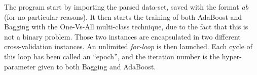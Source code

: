 The program start by importing the parsed data-set, saved with the format \textit{ab} (for no particular reasons). It then starts the training of both AdaBoost and Bagging with the One-Vs-All multi-class technique, due to the fact that this is not a binary problem. Those two instances are encapsulated in two different cross-validation instances. An unlimited \textit{for-loop} is then launched. Each cycle of this loop has been called an ``epoch'', and the iteration number is the hyper-parameter given to both Bagging and AdaBoost.
